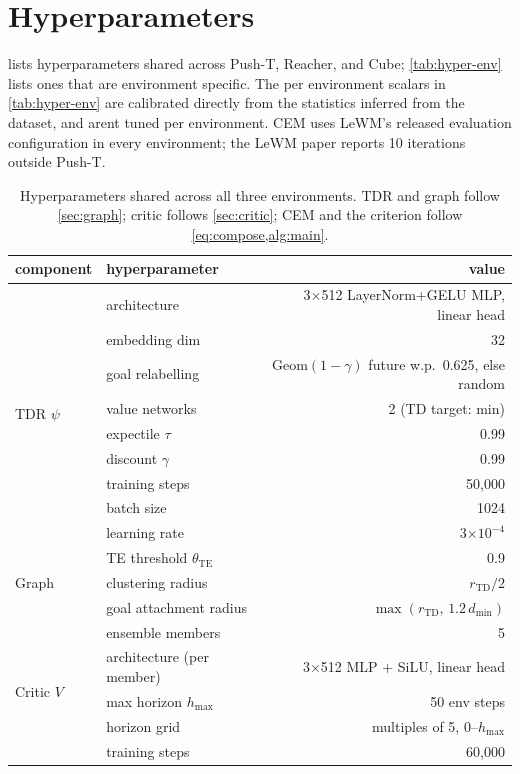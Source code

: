 \documentclass{article} %
\newcommand{\psiT}{\psi}
\newcommand{\Htd}{r_{\mathrm{TD}}}
\theoremstyle{definition}
\theoremstyle{remark}
\begin{document}
\section{Hyperparameters}
\label{app:hyperparams}
 lists hyperparameters shared across Push-T, Reacher, and Cube;
\cref{tab:hyper-env} lists ones that are environment specific. The per
environment scalars in \cref{tab:hyper-env} are calibrated directly from the statistics inferred from the dataset, and arent tuned per environment.
CEM uses LeWM's released evaluation configuration in every environment; the LeWM paper reports 10
iterations outside Push-T.

\begin{table}[h]
\centering\small
\caption{Hyperparameters shared across all three environments. TDR and graph follow \cref{sec:graph};
critic follows \cref{sec:critic}; CEM and the criterion follow \cref{eq:compose,alg:main}.}
\label{tab:hyper-shared}
\begin{tabular}{llr}
\toprule
component & hyperparameter & value \\
\midrule
\multirow{9}{*}{TDR $\psiT$}
 & architecture & 3$\times$512 LayerNorm+GELU MLP, linear head \\
 & embedding dim & 32 \\
 & goal relabelling & $\mathrm{Geom}(1-\gamma)$ future w.p.\ 0.625, else random \\
 & value networks & 2 (TD target: min) \\
 & expectile $\tau$ & 0.99 \\
 & discount $\gamma$ & 0.99 \\
 & training steps & 50{,}000 \\
 & batch size & 1024 \\
 & learning rate & 3$\times10^{-4}$ \\
\midrule
\multirow{3}{*}{Graph}
 & TE threshold $\theta_{\mathrm{TE}}$ & 0.9 \\
 & clustering radius & $\Htd/2$ \\
 & goal attachment radius & $\max(\Htd,\,1.2\,d_{\min})$ \\
\midrule
\multirow{12}{*}{Critic $V$}
 & ensemble members & 5 \\
 & architecture (per member) & 3$\times$512 MLP + SiLU, linear head \\
 & max horizon $h_{\max}$ & 50 env steps \\
 & horizon grid & multiples of 5, 0--$h_{\max}$ \\
 & training steps & 60{,}000 \\

\end{tabular}
\end{table}
\end{document}
